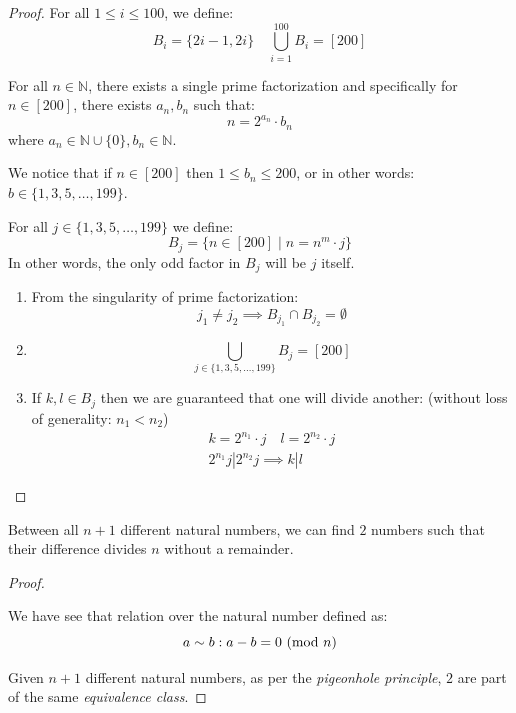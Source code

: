 \documentclass[00_complete]{subfiles}
\begin{document}
\begin{proof}
    For all $1 \leq i \leq 100$, we define:
    $$B_i=\{2i-1,2i\} \quad \bigcup_{i=1}^{100}B_i=[200]$$
    \begin{reminder}
        For all $n \in \mathbb{N}$, there exists a single prime factorization
        and specifically for $n \in [200]$, there exists $a_n,b_n$ such that:
        $$n=2^{a_n}\cdot b_n$$
        where $a_n \in \mathbb{N} \cup \{0\}, b_n \in \mathbb{N}$.
    \end{reminder}
        We notice that if $n \in [200]$ then $1 \leq b_n \leq 200$, or in other
        words: $b \in \{1,3,5,\dots,199\}$.

        For all $j \in \{1,3,5,\dots,199\}$ we define:
        $$B_j = \{n \in [200] \mid n=n^m \cdot j\}$$
        In other words, the only odd factor in $B_j$ will be $j$ itself.
        \begin{enumerate}
            \item From the singularity of prime factorization:
                $$j_1 \neq j_2 \implies B_{j_1}\cap B_{j_2}=\emptyset$$
            \item
                $$\bigcup_{j \in \{1,3,5,\dots,199\}}B_j=[200]$$
            \item If $k,l \in B_j$ then we are guaranteed that one will divide
                another: (without loss of generality: $n_1 < n_2$)
                $$
                \begin{gathered}
                    k=2^{n_1}\cdot j \quad l=2^{n_2} \cdot j \\
                    2^{n_1}j|2^{n_2}j \implies k|l
                \end{gathered}
                $$
        \end{enumerate}
\end{proof}

\begin{claim}
    Between all $n+1$ different natural numbers, we can find $2$ numbers such that
    their difference divides $n$ without a remainder.
\end{claim}

\begin{proof}
    \begin{reminder}
        We have see that relation over the natural number defined as:
        $$a \sim b: a-b=0\ (\mathrm{mod}\ n)$$
    \end{reminder}
    Given $n+1$ different natural numbers, as per the \emph{pigeonhole
    principle}, $2$ are part of the same \emph{equivalence class}.
\end{proof}
\end{document}
